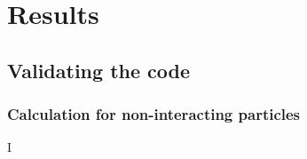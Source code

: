 \chapter{Results}


\section{Validating the code}


\subsection{Calculation for non-interacting particles}

I